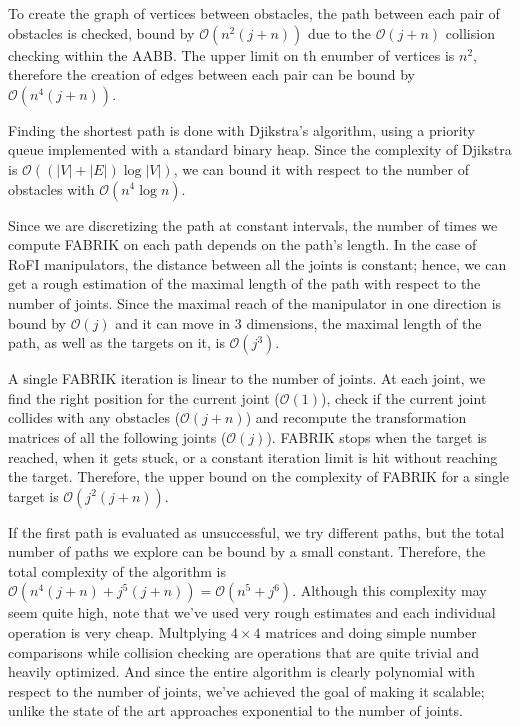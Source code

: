 To create the graph of vertices between obstacles, the path between each pair of obstacles is checked, bound by $\mathcal{O}(n^2 (j+n))$ due to the $\mathcal{O}(j+n)$ collision checking within the AABB. The upper limit on th enumber of vertices is $n^2$, therefore the creation of edges between each pair can be bound by $\mathcal{O}(n^4 (j+n))$.

Finding the shortest path is done with Djikstra's algorithm, using a priority queue implemented with a standard binary heap. Since the complexity of Djikstra is $\mathcal{O}((|V|+|E|) \log{|V|})$, we can bound it with respect to the number of obstacles with $\mathcal{O}(n^4 \log{n})$.

Since we are discretizing the path at constant intervals, the number of times we compute FABRIK on each path depends on the path's length. In the case of RoFI manipulators, the distance between all the joints is constant; hence, we can get a rough estimation of the maximal length of the path with respect to the number of joints. Since the maximal reach of the manipulator in one direction is bound by $\mathcal{O}(j)$ and it can move in 3 dimensions, the maximal length of the path, as well as the targets on it, is $\mathcal{O}(j^3)$.

A single FABRIK iteration is linear to the number of joints. At each joint, we find the right position for the current joint ($\mathcal{O}(1)$), check if the current joint collides with any obstacles ($\mathcal{O}(j+n)$) and recompute the transformation matrices of all the following joints ($\mathcal{O}(j)$). FABRIK stops when the target is reached, when it gets stuck, or a constant iteration limit is hit without reaching the target. Therefore, the upper bound on the complexity of FABRIK for a single target is $\mathcal{O}(j^2(j+n))$.

If the first path is evaluated as unsuccessful, we try different paths, but the total number of paths we explore can be bound by a small constant. Therefore, the total complexity of the algorithm is $\mathcal{O}(n^4(j+n)+j^5(j+n)) = \mathcal{O}(n^5+j^6)$. Although this complexity may seem quite high, note that we've used very rough estimates and each individual operation is very cheap. Multplying $4 \times 4$ matrices and doing simple number comparisons while collision checking are operations that are quite trivial and heavily optimized. And since the entire algorithm is clearly polynomial with respect to the number of joints, we've achieved the goal of making it scalable; unlike the state of the art approaches exponential to the number of joints.

